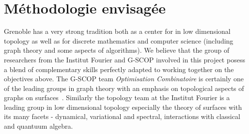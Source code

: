 \documentclass[14pt,fleqn]{article}
\begin{document}
\section{Méthodologie envisagée}

Grenoble  has 
a very strong tradition both 
as a center for in low dimensional topology 
as well as for discrete mathematics and computer science
(including graph theory and some aspects of algorithms). 
We believe that the group of researchers from the Institut Fourier and G-SCOP 
involved
in this project posess a blend of complementary skills 
perfectly adapted
to working together on the objectives above.
The G-SCOP team \emph{Optimisation Combinatoire} is certainly one of the leading groups in graph theory with an emphasis on topological aspects of graphs on surfaces~\cite{es-wqpp-18}. 
Similarly the topology team at the Institut Fourier is a leading group in low dimensional topology 
especially the theory of surfaces 
with its many facets 
- dynamical, variational and spectral,
 interactions with classical and quantuum algebra.
 
%

\vspace{.25in}
\end{document}
